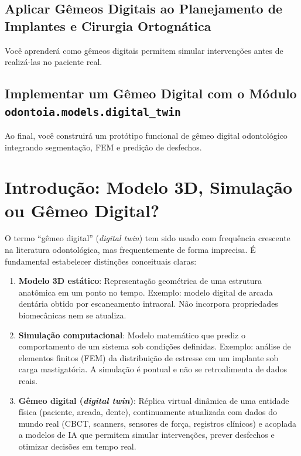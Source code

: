 \subsection{Aplicar Gêmeos Digitais ao Planejamento de Implantes e Cirurgia Ortognática}
Você aprenderá como gêmeos digitais permitem simular intervenções antes de realizá-las no paciente real.

\subsection{Implementar um Gêmeo Digital com o Módulo \texttt{odontoia.models.digital\_twin}}
Ao final, você construirá um protótipo funcional de gêmeo digital odontológico integrando segmentação, FEM e predição de desfechos.

\section{Introdução: Modelo 3D, Simulação ou Gêmeo Digital?}

O termo ``gêmeo digital'' (\textit{digital twin}) tem sido usado com frequência crescente na literatura odontológica, mas frequentemente de forma imprecisa. É fundamental estabelecer distinções conceituais claras:

\begin{enumerate}
    \item \textbf{Modelo 3D estático}: Representação geométrica de uma estrutura anatômica em um ponto no tempo. Exemplo: modelo digital de arcada dentária obtido por escaneamento intraoral. Não incorpora propriedades biomecânicas nem se atualiza.

    \item \textbf{Simulação computacional}: Modelo matemático que prediz o comportamento de um sistema sob condições definidas. Exemplo: análise de elementos finitos (FEM) da distribuição de estresse em um implante sob carga mastigatória. A simulação é pontual e não se retroalimenta de dados reais.

    \item \textbf{Gêmeo digital (\textit{digital twin})}: Réplica virtual dinâmica de uma entidade física (paciente, arcada, dente), continuamente atualizada com dados do mundo real (CBCT, scanners, sensores de força, registros clínicos) e acoplada a modelos de IA que permitem simular intervenções, prever desfechos e otimizar decisões em tempo real.
\end{enumerate}


